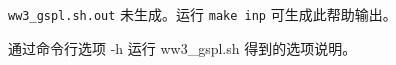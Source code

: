 \begin{figure}[t]
{\scriptsize
{}
  {}
  {\noindent\texttt{ww3\_gspl.sh.out} 未生成。运行 \texttt{make inp} 可生成此帮助输出。}
}
\caption{通过命令行选项 {\file -h} 运行 {\file ww3\_gspl.sh} 得到的选项说明。} \label{fig:gspl}
\end{figure}
